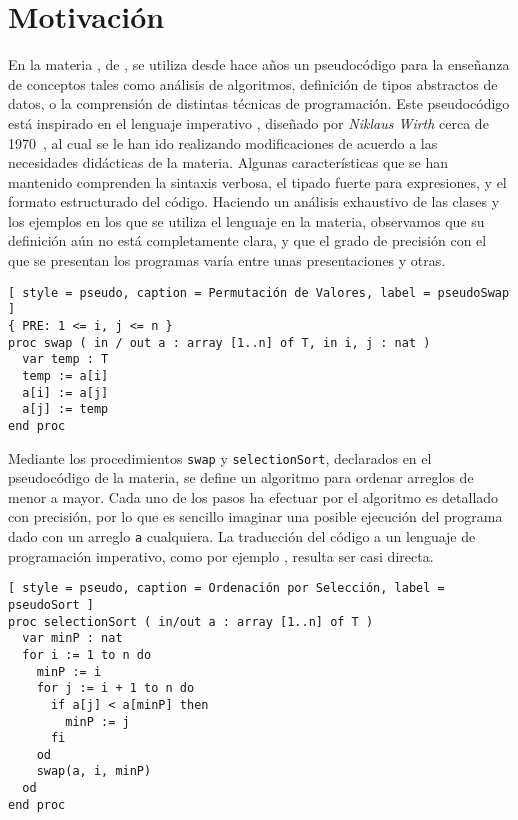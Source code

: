 \section{Motivación}

En la materia \Materia{}, de \Facultad{}, se utiliza desde hace años un pseudocódigo para la enseñanza de conceptos tales como análisis de algoritmos, definición de tipos abstractos de datos, o la comprensión de distintas técnicas de programación.
Este pseudocódigo está inspirado en el lenguaje imperativo \Pascal{}, diseñado por \textit{Niklaus Wirth} cerca de 1970~\cite{Pascal}, al cual se le han ido realizando modificaciones de acuerdo a las necesidades didácticas de la materia.
Algunas características que se han mantenido comprenden la sintaxis verbosa, el tipado fuerte para expresiones, y el formato estructurado del código.
Haciendo un análisis exhaustivo de las clases y los ejemplos en los que se utiliza el lenguaje en la materia, observamos que su definición aún no está completamente clara, y que el grado de precisión con el que se presentan los programas varía entre unas presentaciones y otras.

\begin{lstlisting}[ style = pseudo, caption = Permutación de Valores, label = pseudoSwap ]
{ PRE: 1 <= i, j <= n }
proc swap ( in / out a : array [1..n] of T, in i, j : nat )
  var temp : T
  temp := a[i]
  a[i] := a[j]
  a[j] := temp
end proc
\end{lstlisting}

Mediante los procedimientos \lstinline[style = pseudo]{swap} y \lstinline[style = pseudo]{selectionSort}, declarados en el pseudocódigo de la materia, se define un algoritmo para ordenar arreglos de menor a mayor.
Cada uno de los pasos ha efectuar por el algoritmo es detallado con precisión, por lo que es sencillo imaginar una posible ejecución del programa dado con un arreglo \lstinline[style = pseudo]{a} cualquiera.
La traducción del código a un lenguaje de programación imperativo, como por ejemplo \C{}, resulta ser casi directa.

\begin{lstlisting}[ style = pseudo, caption = Ordenación por Selección, label = pseudoSort ]
proc selectionSort ( in/out a : array [1..n] of T )
  var minP : nat
  for i := 1 to n do
    minP := i
    for j := i + 1 to n do
      if a[j] < a[minP] then
        minP := j
      fi
    od
    swap(a, i, minP)
  od
end proc
\end{lstlisting}

